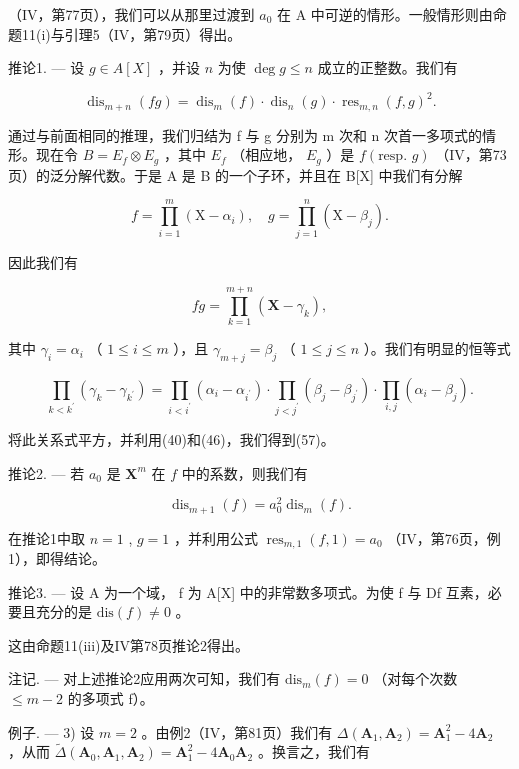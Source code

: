 （IV，第77页），我们可以从那里过渡到 \(a_0\) 在 A 中可逆的情形。一般情形则由命题11(i)与引理5（IV，第79页）得出。

推论1. --- 设 \(g \in A[X]\) ，并设 \(n\) 为使 \(\deg g \leqslant n\) 成立的正整数。我们有

\[
\operatorname{dis} _ {m + n} (f g) = \operatorname{dis} _ {m} (f) \cdot \operatorname{dis} _ {n} (g) \cdot \operatorname{res} _ {m, n} (f, g) ^ {2}.\tag{57}
\]

通过与前面相同的推理，我们归结为 f 与 g 分别为 m 次和 n 次首一多项式的情形。现在令 \(B = E_{f} \otimes E_{g}\) ，其中 \(E_{f}\) （相应地， \(E_{g}\) ）是 \(f(\text{resp. } g)\) （IV，第73页）的泛分解代数。于是 A 是 B 的一个子环，并且在 B{[}X{]} 中我们有分解

\[
f = \prod_ {i = 1} ^ {m} \left(\mathrm{X} - \alpha_ {i}\right), \quad g = \prod_ {j = 1} ^ {n} \left(\mathrm{X} - \beta_ {j}\right).
\]

因此我们有

\[
f g = \prod_ {k = 1} ^ {m + n} \left(\mathbf {X} - \gamma_ {k}\right),
\]

其中 \(\gamma_{i} = \alpha_{i}\) （ \(1 \leqslant i \leqslant m\) ），且 \(\gamma_{m + j} = \beta_{j}\) （ \(1 \leqslant j \leqslant n\) ）。我们有明显的恒等式

\[
\prod_ {k <   k ^ {\prime}} \left(\gamma_ {k} - \gamma_ {k ^ {\prime}}\right) = \prod_ {i <   i ^ {\prime}} \left(\alpha_ {i} - \alpha_ {i ^ {\prime}}\right) \cdot \prod_ {j <   j ^ {\prime}} \left(\beta_ {j} - \beta_ {j ^ {\prime}}\right) \cdot \prod_ {i, j} \left(\alpha_ {i} - \beta_ {j}\right).
\]

将此关系式平方，并利用(40)和(46)，我们得到(57)。

推论2. --- 若 \(a_{0}\) 是 \(\mathbf{X}^{m}\) 在 \(f\) 中的系数，则我们有

\[
\operatorname{dis} _ {m + 1} (f) = a _ {0} ^ {2} \operatorname{dis} _ {m} (f).\tag{58}
\]

在推论1中取 \(n = 1\) , \(g = 1\) ，并利用公式 \(\operatorname{res}_{m,1}(f,1) = a_0\) （IV，第76页，例1），即得结论。

推论3. --- 设 A 为一个域， f 为 A{[}X{]} 中的非常数多项式。为使 f 与 Df 互素，必要且充分的是 \(\text{dis}(f) \neq 0\) 。

这由命题11(iii)及IV第78页推论2得出。

注记. --- 对上述推论2应用两次可知，我们有 \(\mathrm{dis}_{m}(f)=0\) （对每个次数 \(\leqslant m-2\) 的多项式 f）。

例子. --- 3) 设 \(m = 2\) 。由例2（IV，第81页）我们有 \(\Delta(\mathbf{A}_1, \mathbf{A}_2) = \mathbf{A}_1^2 - 4\mathbf{A}_2\) ，从而 \(\tilde{\Delta}(\mathbf{A}_0, \mathbf{A}_1, \mathbf{A}_2) = \mathbf{A}_1^2 - 4\mathbf{A}_0\mathbf{A}_2\) 。换言之，我们有

